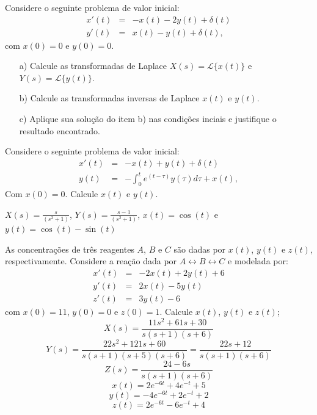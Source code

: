 \begin{exer}
Considere o seguinte problema de valor inicial:
 \begin{eqnarray*}
x'(t)&=&- x(t) -2 y(t)+\delta(t)\\
y'(t)&=& x(t) - y(t)+\delta(t),
\end{eqnarray*}
com $x(0)=0$ e $y(0)=0$.
\begin{itemize}
       
 \item[a)] Calcule as transformadas de Laplace $X(s)=\mathcal{L}\{x(t)\}$ e $Y(s)=\mathcal{L}\{y(t)\}$.
 \item[b)] Calcule as transformadas inversas de Laplace $x(t)$ e $y(t)$.
 \item[c)] Aplique sua solução do item b) nas condições inciais e justifique o resultado encontrado.
\end{itemize}
\end{exer}

\begin{exer} Considere o seguinte problema de valor inicial:
\begin{eqnarray*}
      x'(t)&=&-x(t)+ y(t)+\delta(t) \\
      y(t)&=& -\int_0^t e^{(t-\tau)} y(\tau)d\tau+x(t),
\end{eqnarray*}
Com $x(0)=0$. Calcule $x(t)$ e $y(t)$.
\end{exer}
\begin{resp}
 $X(s)=\frac{s}{\left(s^2+1\right)}$, $Y(s)=\frac{s-1}{\left(s^2+1\right)}$, $x(t)=\cos(t)$ e $y(t)=\cos(t)-\sin(t)$
\end{resp}

\begin{exer}As concentrações de três reagentes $A$, $B$ e $C$ são dadas por $x(t)$, $y(t)$ e $z(t)$, respectivamente. Considere a reação dada por $A \longleftrightarrow B \longleftrightarrow C$ e modelada por:
\begin{eqnarray*}
       x'(t) &=& -2 x(t) + 2 y(t)+6\\
       y'(t) &=& 2 x(t) - 5 y(t)\\
       z'(t) &=& 3  y(t)-6
\end{eqnarray*}
com $x(0)=11$, $y(0)=0$ e $z(0)=1$. Calcule $x(t)$, $y(t)$ e $z(t)$;
$$X(s)=\frac{11s^2+61s+30}{s(s+1)(s+6)}$$
$$Y(s)=\frac{22s^2+121s+60}{s(s+1)(s+5)(s+6)}=\frac{22 s + 12}{s (s + 1) (s + 6)}$$
$$Z(s)=\frac{24-6s}{s(s+1)(s+6)}$$
$$x(t)= 2 e^{-6 t} + 4 e^{-t} + 5$$
$$y(t) = -4 e^{-6 t} + 2e^{-t} + 2$$
$$z(t) = 2 e^{-6 t} -6e^{-t} + 4$$
\end{exer}
       